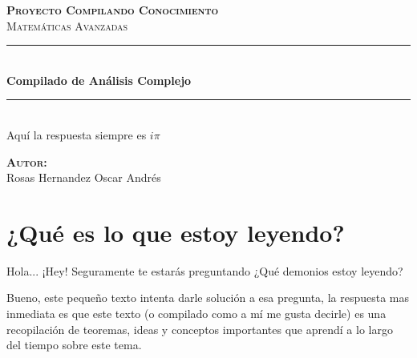 \documentclass[12pt, fleqn]{report}                             %
\author{Oscar Andrés Rosas}                                     %
\begin{document}
\begin{titlepage}

    \center
    \textbf{\textsc{\Large Proyecto Compilando Conocimiento}}\\[1.0cm] 
    \textsc{\Large Matemáticas Avanzadas}\\[1.0cm] 

    \rule{\linewidth}{0.5mm} \\[1.0cm]
        { \huge \bfseries Compilado de Análisis Complejo}\\[1.0cm] 
    \rule{\linewidth}{0.5mm} \\[2.0cm]
    
    {\LARGE Aquí la respuesta siempre es $i\pi$}\\[7cm] 
    
    \begin{center} \large
    \textbf{\textsc{Autor:}}\\
    Rosas Hernandez Oscar Andrés
    \end{center}

    \vfill

\end{titlepage}

\tableofcontents{}
\label{sec:Index}

\clearpage



\section{¿Qué es lo que estoy leyendo?}

    
    Hola... ¡Hey! Seguramente te estarás preguntando
    ¿Qué demonios estoy leyendo?

    Bueno, este pequeño texto intenta darle solución a esa pregunta, la respuesta mas inmediata es
    que este texto (o compilado como a mí me gusta decirle) es una recopilación de teoremas, ideas
    y conceptos importantes que aprendí a lo largo del tiempo sobre este tema.
\end{document}

